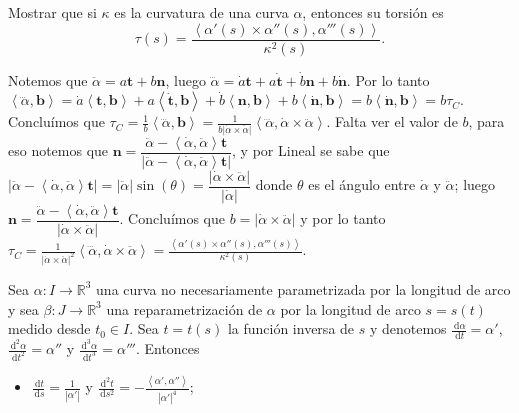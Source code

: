 \documentclass[11pt]{article}
\newcommand{\R}{{\mathbb{R}}}
\newcommand\dd{\,\mathrm{d}}
\newcommand\abs[1]{\left\lvert#1\right\rvert}
\newcommand\ip[1]{\left\langle#1\right\rangle}
\renewcommand\tt{\mathbf{t}}
\newcommand\nn{\mathbf{n}}
\newcommand\bb{\mathbf{b}}                      %
\newenvironment{proof}[1][Demostraci\'on]{\begin{trivlist}
		\item[\hskip \labelsep {\bfseries #1}]}{\end{trivlist}}
\newcommand{\qed}{\nobreak \ifvmode \relax \else
	\ifdim\lastskip<1.5em \hskip-\lastskip
	\hskip1.5em plus0em minus0.5em \fi \nobreak
	\vrule height0.75em width0.5em depth0.25em\fi}
\begin{document}
\begin{enumerate}
	\item Mostrar que si $\kappa$ es la curvatura de una curva $\alpha$, entonces su
	torsi\'on es
	\[
	\tau(s) = \frac{\ip{\alpha'(s)\times \alpha''(s) ,\alpha'''(s)}}{\kappa^2(s)}.
	\]
	
	\label{Ejercicio 8}
	
	\begin{proof}
		
		Notemos que $\ddot{\alpha} = a \tt + b \nn$, luego $\dddot{\alpha} = \dot{a} \tt + a \dot{\tt} + \dot{b} \nn + b \dot{\nn}$. Por lo tanto $\ip{\dddot{\alpha}, \bb} = \dot{a} \ip{\tt , \bb} + a \ip{\dot{\tt} , \bb} + \dot{b} \ip{\nn , \bb} + b \ip{\dot{\nn} , \bb} = b \ip{\dot{\nn} , \bb} = b \tau_C$. Conclu\'imos que $\tau_C = \frac{1}{b} \ip{\dddot{\alpha} , \bb} = \frac{1}{b \abs{\dot{\alpha} \times \ddot{\alpha}}}\ip{\dddot{\alpha}, \dot{\alpha} \times \ddot{\alpha}} $. Falta ver el valor de $b$, para eso notemos que $\nn = \dfrac{\ddot{\alpha} - \ip{\dot{\alpha},\ddot{\alpha}}\tt}{\abs{\ddot{\alpha} - \ip{\dot{\alpha},\ddot{\alpha}}\tt}}$, y por Lineal se sabe que $\abs{\ddot{\alpha} - \ip{\dot{\alpha},\ddot{\alpha}}\tt} = \abs{\ddot{\alpha}}\sin(\theta) = \dfrac{\abs{\dot{\alpha} \times \ddot{\alpha}}}{\abs{\dot{\alpha}}} $ donde $\theta$ es el \'angulo entre $\dot{\alpha}$ y $\ddot{\alpha}$; luego $\nn = \dfrac{\ddot{\alpha} - \ip{\dot{\alpha},\ddot{\alpha}}\tt}{\abs{\dot{\alpha} \times \ddot{\alpha}}}$. Conclu\'imos que $b = \abs{\dot{\alpha} \times \ddot{\alpha}}$ y por lo tanto $\tau_C = \frac{1}{\abs{\dot{\alpha} \times \ddot{\alpha}}^2}\ip{\dddot{\alpha}, \dot{\alpha} \times \ddot{\alpha}} = \frac{\ip{\alpha'(s)\times \alpha''(s) ,\alpha'''(s)}}{\kappa^2(s)}$. \qed
		
		
	\end{proof}
	
	\item Sea $\alpha:I\to\R^3$ una curva no necesariamente parametrizada por
	la longitud de arco y sea $\beta:J\to\R^3$ una reparametrizaci\'on de
	$\alpha$ por la longitud de arco $s=s(t)$ medido desde $t_0\in I$. Sea
	$t=t(s)$ la funci\'on inversa de $s$ y denotemos
	$\frac{\dd\alpha}{\dd t}=\alpha'$, $\frac{\dd^2\alpha}{\dd t^2}=\alpha''$
	y $\frac{\dd^3\alpha}{\dd t^3}=\alpha'''$. Entonces
	
	\begin{itemize}
		
		\item $\frac{\dd t}{\dd s}=\frac{1}{\abs{\alpha'}}$ y
		$\frac{\dd^2t}{\dd s^2}=-\frac{\ip{\alpha',\alpha''}}{\abs{\alpha'}^4}$;
		

\end{itemize}
\end{enumerate}
\end{document}

